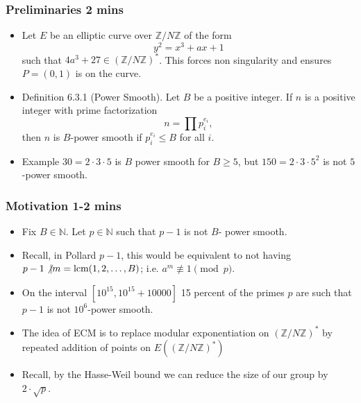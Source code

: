 \documentclass{beamer}
\begin{document}
\begin{frame}
\frametitle{Preliminaries 2 mins}
\begin{itemize}
\item Let $E$ be an elliptic curve over $\mathbb{Z}/N\mathbb{Z}$ of the form
$$
	y^2 = x^3 + ax + 1
$$
such that $4a^3 + 27 \in \left(\mathbb{Z}/N\mathbb{Z}\right)^*$. This forces non singularity and ensures $P = (0,1)$ is on the curve.

\item Definition 6.3.1 (Power Smooth). Let $B$ be a positive integer. If $n$ is a positive integer with prime factorization
$$
    n = \prod p_i^{e_i},
$$
then $n$ is $B$-power smooth if $p_i^{e_i} \leq B$ for all $i$.

\item Example $30 = 2\cdot 3\cdot 5$ is $B$ power smooth for $B \geq 5$, but $150 = 2\cdot 3 \cdot 5^2$ is not $5$-power smooth.
\end{itemize}
\end{frame}

\begin{frame}
\frametitle{Motivation 1-2 mins}
\begin{itemize}
\item Fix $B \in \mathbb{N}$. Let $p \in \mathbb{N}$ such that $p-1$ is not $B$- power smooth.

\item Recall, in Pollard $p-1$, this would be equivalent to not having $p-1 \not \vert m = \text{lcm}(1,2, \ldots, B)$; i.e. $a^m \not \equiv 1 \pmod{p}$.

\item On the interval $[10^{15}, 10^{15} + 10000]$ 15 percent of the primes $p$ are such that $p-1$ is not $10^{6}$-power smooth.

\item The idea of ECM is to replace modular exponentiation on $\left(\mathbb{Z}/N\mathbb{Z}\right)^*$ by repeated addition of points on $E\left(\left(\mathbb{Z}/N\mathbb{Z}\right)^*\right)$

\item Recall, by the Hasse-Weil bound we can reduce the size of our group by $2\cdot \sqrt{p}$.
\end{itemize}
\end{frame}
\end{document}
